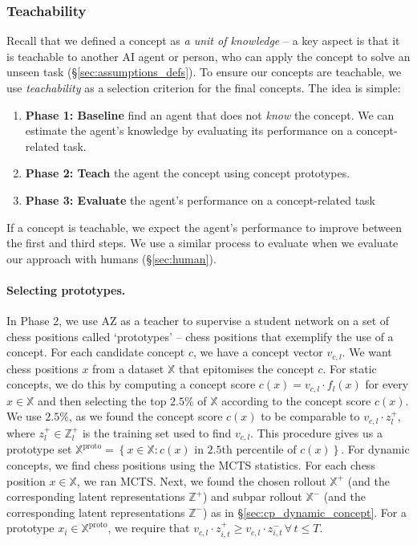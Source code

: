 \documentclass{article}
\def\Xset{\mathbb{X}}
\def\Zset{\mathbb{Z}}
\def\vcld{v_{c,l}\cdot}
\def\vcl{v_{c,l}}
\begin{document}
\subsubsection{Teachability} \label{sec:teachability}
Recall that we defined a concept as \textit{a unit of knowledge} -- a key aspect is that it is teachable to another AI agent or person, who can apply the concept to solve an unseen task (\S\ref{sec:assumptions_defs}). 
To ensure our concepts are teachable, we use \textit{teachability} as a selection criterion for the final concepts. 
The idea is simple: 
\begin{enumerate}
    \item \textbf{Phase 1: Baseline} find an agent that does not \textit{know} the concept. We can estimate the agent's knowledge by evaluating its performance on a concept-related task. 
    \item \textbf{Phase 2: Teach} the agent the concept using concept prototypes. 
    \item \textbf{Phase 3: Evaluate} the agent's performance on a concept-related task
\end{enumerate}
If a concept is teachable, we expect the agent's performance to improve between the first and third steps. We use a similar process to evaluate when we evaluate our approach with humans (\S\ref{sec:human}). 
\FloatBarrier

\paragraph{Selecting prototypes.}
In Phase 2, we use AZ as a teacher to supervise a student network on a set of chess positions called `prototypes' -- chess positions that exemplify the use of a concept.
For each candidate concept $c$, we have a concept vector $\vcl$. We want chess positions $x$ from a dataset $\Xset$ that epitomises the concept $c$. 
For static concepts, we do this by computing a concept score $c(x) = \vcld f_l(x)$ for every $x\in \Xset$ and then selecting the top $2.5\%$ of $\Xset$ according to the concept score $c(x)$.
We use $2.5\%$, as we found the concept score $c(x)$ to be comparable to $\vcld z_l^+$, where $z_l^+ \in \Zset_l^+$ is the training set used to find $\vcl$.
This procedure gives us a prototype set $\Xset^{\mathrm{proto}} = \left\{x\in \Xset: c(x)\text{ in 2.5th percentile of } c(x) \right\}$. 
For dynamic concepts, we find chess positions using the MCTS statistics. For each chess position $x \in \Xset$, we ran MCTS. Next, we found the chosen rollout $\Xset^{+}$ (and the corresponding latent representations $\mathbb{Z}^{+}$) and subpar rollout $\Xset^{-}$ (and the corresponding latent representations $\mathbb{Z}^{-}$) as in \S\ref{sec:cp_dynamic_concept}. For a prototype $x_i \in \Xset^{\mathrm{proto}}$, we require that $\vcl \cdot z^{+}_{i,t} \geq \vcl \cdot z^{-}_{i,t} \, \forall \, t \leq T$. 
\end{document}
